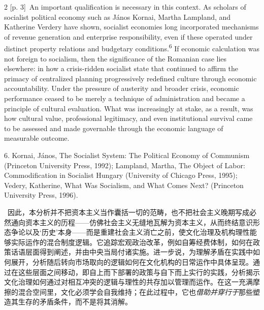 \documentclass[10pt,a4paper]{article}
\begin{document}
\begin{paracol}{2}
\switchcolumn
{\scriptsize\color{gray} [p. 3]}\ An important qualification is necessary in this context. As scholars of socialist political economy such as János Kornai, Martha Lampland, and Katherine Verdery have shown, socialist economies long incorporated mechanisms of revenue generation and enterprise responsibility, even if these operated under distinct property relations and budgetary conditions.\nobreak\textsuperscript{6} If economic calculation was not foreign to socialism, then the significance of the Romanian case lies elsewhere: in how a crisis-ridden socialist state that continued to affirm the primacy of centralized planning progressively redefined culture through economic accountability. Under the pressure of austerity and broader crisis, economic performance ceased to be merely a technique of administration and became a principle of cultural evaluation. What was increasingly at stake, as a result, was how cultural value, professional legitimacy, and even institutional survival came to be assessed and made governable through the economic language of measurable outcome.\par{\small 6. Kornai, János, The Socialist System: The Political Economy of Communism (Princeton University Press, 1992); Lampland, Martha, The Object of Labor: Commodification in Socialist Hungary (University of Chicago Press, 1995); Vedery, Katherine, What Was Socialism, and What Comes Next? (Princeton University Press, 1996).\par}
\switchcolumn*
{\scriptsize\color{gray} [p. 3]}\ 因此，本分析并不把资本主义当作囊括一切的范畴，也不把社会主义晚期写成必然通向资本主义的历程——仿佛社会主义无缝地瓦解为资本主义，从而终结意识形态争论以及‘历史’本身——而是重建社会主义消亡之前，使文化治理及机构理性能够实际运作的混合制度逻辑。它追踪宏观政治改革，例如自筹经费体制，如何在政策话语层面得到阐述，并由中央当局付诸实施。进一步说，为理解矛盾在实践中如何展开，分析随后转向市场取向的逻辑如何在文化机构的日常运作中具体呈现。通过在这些层面之间移动，即自上而下部署的政策与自下而上实行的实践，分析揭示文化治理如何通过对相互冲突的逻辑与理性的共存加以管理而运作。在这一充满摩擦的混合空间里，文化必须学会自我维持；在此过程中，它也\textit{借助并穿行于}那些塑造其生存的矛盾条件，而不是将其消解。\par
\switchcolumn

\end{paracol}
\end{document}
